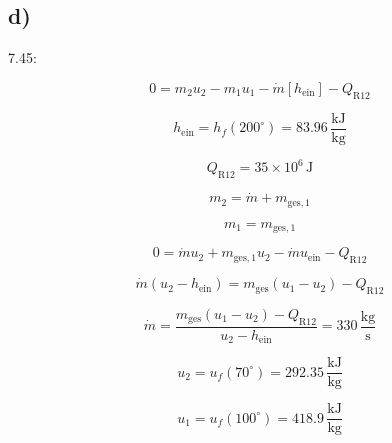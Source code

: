 

\subsection*{d)}
7.45:

\[
0 = m_2 u_2 - m_1 u_1 - \dot{m} \left[ h_{\text{ein}} \right] - Q_{\text{R12}}
\]

\[
h_{\text{ein}} = h_f (200^\circ) = 83.96 \, \frac{\text{kJ}}{\text{kg}}
\]

\[
Q_{\text{R12}} = 35 \times 10^6 \, \text{J}
\]

\[
m_2 = \dot{m} + m_{\text{ges},1}
\]

\[
m_1 = m_{\text{ges},1}
\]

\[
0 = \dot{m} u_2 + m_{\text{ges},1} u_2 - \dot{m} u_{\text{ein}} - Q_{\text{R12}}
\]

\[
\dot{m} (u_2 - h_{\text{ein}}) = m_{\text{ges}} (u_1 - u_2) - Q_{\text{R12}}
\]

\[
\dot{m} = \frac{m_{\text{ges}} (u_1 - u_2) - Q_{\text{R12}}}{u_2 - h_{\text{ein}}} = 330 \, \frac{\text{kg}}{\text{s}}
\]

\[
u_2 = u_f (70^\circ) = 292.35 \, \frac{\text{kJ}}{\text{kg}}
\]

\[
u_1 = u_f (100^\circ) = 418.9 \, \frac{\text{kJ}}{\text{kg}}
\]